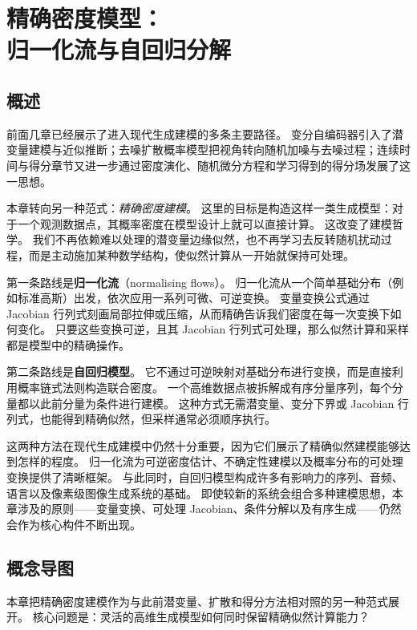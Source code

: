 \chapter[精确密度模型：归一化流与自回归分解]{精确密度模型：\\归一化流与自回归分解}
\section*{概述}

前面几章已经展示了进入现代生成建模的多条主要路径。
变分自编码器引入了潜变量建模与近似推断；去噪扩散概率模型把视角转向随机加噪与去噪过程；连续时间与得分章节又进一步通过密度演化、随机微分方程和学习得到的得分场发展了这一思想。

本章转向另一种范式：\emph{精确密度建模}。
这里的目标是构造这样一类生成模型：对于一个观测数据点，其概率密度在模型设计上就可以直接计算。
这改变了建模哲学。
我们不再依赖难以处理的潜变量边缘似然，也不再学习去反转随机扰动过程，而是主动施加某种数学结构，使似然计算从一开始就保持可处理。

第一条路线是\textbf{归一化流}（normalising flows）。
归一化流从一个简单基础分布（例如标准高斯）出发，依次应用一系列可微、可逆变换。
变量变换公式通过 Jacobian 行列式刻画局部拉伸或压缩，从而精确告诉我们密度在每一次变换下如何变化。
只要这些变换可逆，且其 Jacobian 行列式可处理，那么似然计算和采样都是模型中的精确操作。

第二条路线是\textbf{自回归模型}。
它不通过可逆映射对基础分布进行变换，而是直接利用概率链式法则构造联合密度。
一个高维数据点被拆解成有序分量序列，每个分量都以此前分量为条件进行建模。
这种方式无需潜变量、变分下界或 Jacobian 行列式，也能得到精确似然，但采样通常必须顺序执行。

这两种方法在现代生成建模中仍然十分重要，因为它们展示了精确似然建模能够达到怎样的程度。
归一化流为可逆密度估计、不确定性建模以及概率分布的可处理变换提供了清晰框架。
与此同时，自回归模型构成许多有影响力的序列、音频、语言以及像素级图像生成系统的基础。
即使较新的系统会组合多种建模思想，本章涉及的原则——变量变换、可处理 Jacobian、条件分解以及有序生成——仍然会作为核心构件不断出现。

\section*{概念导图}

本章把精确密度建模作为与此前潜变量、扩散和得分方法相对照的另一种范式展开。
核心问题是：灵活的高维生成模型如何同时保留精确似然计算能力？


